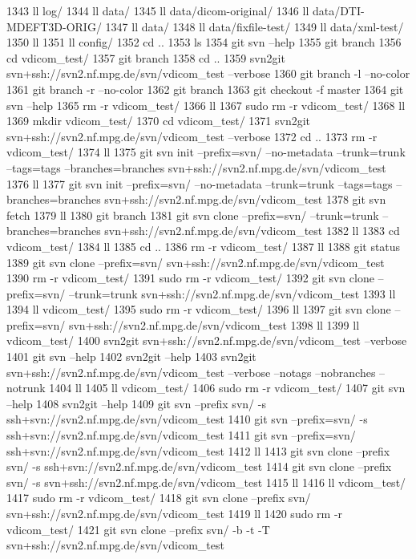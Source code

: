  1343  ll log/
 1344  ll data/
 1345  ll data/dicom-original/
 1346  ll data/DTI-MDEFT3D-ORIG/
 1347  ll data/
 1348  ll data/fixfile-test/
 1349  ll data/xml-test/
 1350  ll
 1351  ll config/
 1352  cd ..
 1353  ls
 1354  git svn --help
 1355  git branch
 1356  cd vdicom_test/
 1357  git branch
 1358  cd ..
 1359  svn2git svn+ssh://svn2.nf.mpg.de/svn/vdicom_test --verbose
 1360  git branch -l --no-color
 1361  git branch -r --no-color
 1362  git branch
 1363  git checkout -f master
 1364  git svn --help
 1365  rm -r vdicom_test/
 1366  ll
 1367  sudo rm -r vdicom_test/
 1368  ll
 1369  mkdir vdicom_test/
 1370  cd vdicom_test/
 1371  svn2git svn+ssh://svn2.nf.mpg.de/svn/vdicom_test --verbose
 1372  cd ..
 1373  rm -r vdicom_test/
 1374  ll
 1375  git svn init --prefix=svn/ --no-metadata --trunk=trunk --tags=tags --branches=branches svn+ssh://svn2.nf.mpg.de/svn/vdicom_test
 1376  ll
 1377  git svn init --prefix=svn/ --no-metadata --trunk=trunk --tags=tags --branches=branches svn+ssh://svn2.nf.mpg.de/svn/vdicom_test
 1378  git svn fetch
 1379  ll
 1380  git branch
 1381  git svn clone --prefix=svn/ --trunk=trunk --branches=branches svn+ssh://svn2.nf.mpg.de/svn/vdicom_test
 1382  ll
 1383  cd vdicom_test/
 1384  ll
 1385  cd ..
 1386  rm -r vdicom_test/
 1387  ll
 1388  git status
 1389  git svn clone --prefix=svn/ svn+ssh://svn2.nf.mpg.de/svn/vdicom_test
 1390  rm -r vdicom_test/
 1391  sudo rm -r vdicom_test/
 1392  git svn clone --prefix=svn/ --trunk=trunk svn+ssh://svn2.nf.mpg.de/svn/vdicom_test
 1393  ll
 1394  ll vdicom_test/
 1395  sudo rm -r vdicom_test/
 1396  ll
 1397  git svn clone --prefix=svn/ svn+ssh://svn2.nf.mpg.de/svn/vdicom_test
 1398  ll
 1399  ll vdicom_test/
 1400  svn2git svn+ssh://svn2.nf.mpg.de/svn/vdicom_test --verbose
 1401  git svn --help
 1402  svn2git --help
 1403  svn2git svn+ssh://svn2.nf.mpg.de/svn/vdicom_test --verbose --notags --nobranches --notrunk
 1404  ll
 1405  ll vdicom_test/
 1406  sudo rm -r vdicom_test/
 1407  git svn --help
 1408  svn2git --help
 1409  git svn --prefix svn/ -s ssh+svn://svn2.nf.mpg.de/svn/vdicom_test 
 1410  git svn --prefix=svn/ -s ssh+svn://svn2.nf.mpg.de/svn/vdicom_test 
 1411  git svn --prefix=svn/ ssh+svn://svn2.nf.mpg.de/svn/vdicom_test 
 1412  ll
 1413  git svn clone --prefix svn/ -s ssh+svn://svn2.nf.mpg.de/svn/vdicom_test 
 1414  git svn clone --prefix svn/ -s svn+ssh://svn2.nf.mpg.de/svn/vdicom_test 
 1415  ll
 1416  ll vdicom_test/
 1417  sudo rm -r vdicom_test/
 1418  git svn clone --prefix svn/ svn+ssh://svn2.nf.mpg.de/svn/vdicom_test 
 1419  ll
 1420  sudo rm -r vdicom_test/
 1421  git svn clone --prefix svn/ -b -t -T svn+ssh://svn2.nf.mpg.de/svn/vdicom_test 
